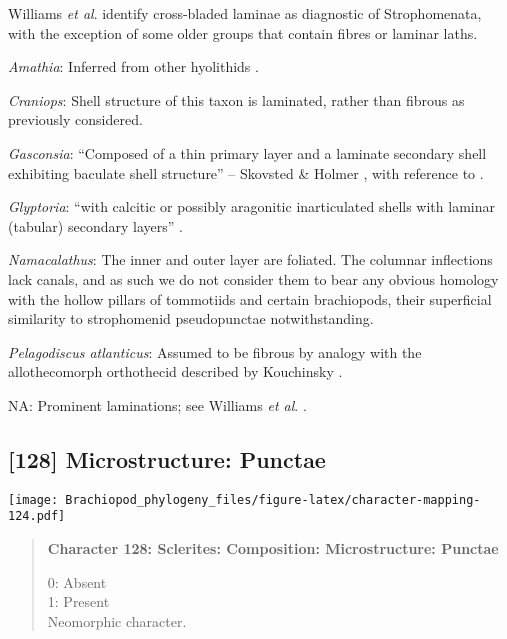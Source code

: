 \documentclass[openany]{book}
\theoremstyle{definition}
\theoremstyle{definition}
\theoremstyle{definition}
\theoremstyle{remark}
\begin{document}
Williams \emph{et al}.
\citeyearpar{Williams2000LinguliformeaCraniiformea} identify
cross-bladed laminae as diagnostic of Strophomenata, with the exception
of some older groups that contain fibres or laminar laths.

\hypertarget{Amathia-coding-127}{}
\emph{Amathia}: Inferred from other hyolithids
\citep[e.g.][]{Moore2018Plywoodlike}.

\hypertarget{Craniops-coding-127}{}
\emph{Craniops}: Shell structure of this taxon is laminated, rather than
fibrous as previously considered.

\hypertarget{Gasconsia-coding-127}{}
\emph{Gasconsia}: ``Composed of a thin primary layer and a laminate
secondary shell exhibiting baculate shell structure'' -- Skovsted \&
Holmer \citeyearpar{Skovsted2005EarlyCambrian}, with reference to
\citet{Skovsted2003EarlyCambrian}.

\hypertarget{Glyptoria-coding-127}{}
\emph{Glyptoria}: ``with calcitic or possibly aragonitic inarticulated
shells with laminar (tabular) secondary layers''
\citep{Williams2000LinguliformeaCraniiformea}.

\hypertarget{Namacalathus-coding-127}{}
\emph{Namacalathus}: The inner and outer layer are foliated. The
columnar inflections lack canals, and as such we do not consider them to
bear any obvious homology with the hollow pillars of tommotiids and
certain brachiopods, their superficial similarity to strophomenid
pseudopunctae notwithstanding.

\hypertarget{Pelagodiscus_atlanticus-coding-127}{}
\emph{Pelagodiscus atlanticus}: Assumed to be fibrous by analogy with
the allothecomorph orthothecid described by Kouchinsky
\citeyearpar{Kouchinsky2000Skeletalmicrostructures}.

\hypertarget{NA-coding-127}{}
NA: Prominent laminations; see Williams \emph{et al}.
\citeyearpar{Williams2004Chemicostructure}.

\subsection*{{[}128{]} Microstructure:
Punctae}\label{microstructure-punctae}

\texttt{[image: Brachiopod\_phylogeny\_files/figure-latex/character-mapping-124.pdf]}

\begin{quote}
\textbf{Character 128: Sclerites: Composition: Microstructure: Punctae}

0: Absent\\
1: Present\\
Neomorphic character.
\end{quote}
\end{document}
